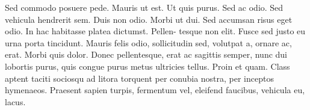 \documentclass[english]{uzhpub}
\begin{document}
Sed commodo posuere pede. Mauris ut est. Ut quis purus. Sed ac odio.
Sed vehicula hendrerit sem. Duis non odio. Morbi ut dui. Sed accumsan
risus eget odio. In hac habitasse platea dictumst. Pellen- tesque
non elit. Fusce sed justo eu urna porta tincidunt. Mauris felis odio,
sollicitudin sed, volutpat a, ornare ac, erat. Morbi quis dolor. Donec
pellentesque, erat ac sagittis semper, nunc dui lobortis purus, quis
congue purus metus ultricies tellus. Proin et quam. Class aptent taciti
sociosqu ad litora torquent per conubia nostra, per inceptos hymenaeos.
Praesent sapien turpis, fermentum vel, eleifend faucibus, vehicula
eu, lacus. 
\end{document}
